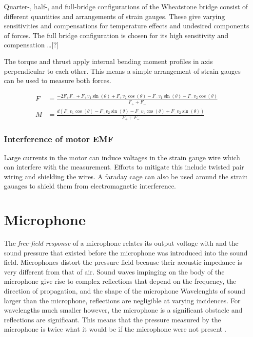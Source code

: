 \documentclass{article}
\begin{document}
Quarter-, half-, and full-bridge configurations of the Wheatstone bridge consist of different quantities and arrangements of strain gauges.
These give varying sensitivities and compensations for temperature effects and undesired components of forces.
The full bridge configuration is chosen for its high sensitivity and compensation \dots [?]

The torque and thrust apply internal bending moment profiles in axis perpendicular to each other.
This means a simple arrangement of strain gauges can be used to measure both forces.




\begin{align}
    F &= \frac{- 2 F_{+} F_{-} + F_{+} v_{1} \sin{\left(\theta \right)} + F_{+} v_{2} \cos{\left(\theta \right)} - F_{-} v_{1} \sin{\left(\theta \right)} - F_{-} v_{2} \cos{\left(\theta \right)}}{F_{+} + F_{-}} \\
    M &= \frac{d \left(F_{+} v_{1} \cos{\left(\theta \right)} - F_{+} v_{2} \sin{\left(\theta \right)} - F_{-} v_{1} \cos{\left(\theta \right)} + F_{-} v_{2} \sin{\left(\theta \right)}\right)}{F_{+} + F_{-}}
\end{align}

\subsubsection{Interference of motor EMF}

Large currents in the motor can induce voltages in the strain gauge wire which can interfere with the measurement.
Efforts to mitigate this include twisted pair wiring and shielding the wires.
A faraday cage can also be used around the strain gauages to shield them from electromagnetic interference.


\section{Microphone}

The \textit{free-field response} of a microphone relates its output voltage with and the sound pressure that existed before the microphone was introduced into the sound field.
Microphones distort the pressure field because their acoustic impedance is very different from that of air.
Sound waves impinging on the body of the microphone give rise to complex reflections that depend on the frequency, the direction of propagation, and the shape of the microphone \cite{measurement_systems}
Wavelenghts of sound larger than the microphone, reflections are negligible at varying incidences.
For wavelengths much smaller however, the microphone is a significant obstacle and reflections are significant.
This means that the pressure measured by the microphone is twice what it would be if the microphone were not present \cite{measurement_systems}.
\end{document}
